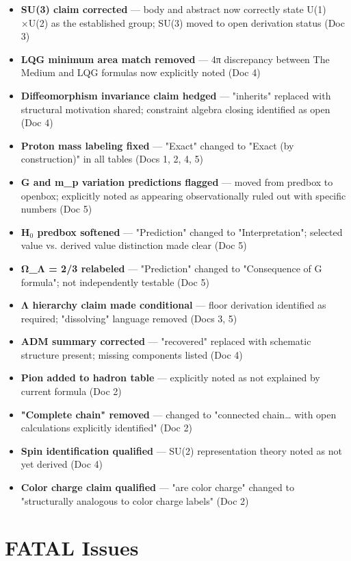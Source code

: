 \documentclass[11pt,letterpaper]{article}
\begin{document}
\begin{itemize}
\item \textbf{SU(3) claim corrected} --- body and abstract now correctly state U(1) ×U(2)
as the established group; SU(3) moved to open derivation status (Doc 3)
\item \textbf{LQG minimum area match removed} --- 4π discrepancy between The Medium and
LQG formulas now explicitly noted (Doc 4)
\item \textbf{Diffeomorphism invariance claim hedged} --- "inherits" replaced with
structural motivation shared; constraint algebra closing identified as open (Doc 4)
\item \textbf{Proton mass labeling fixed} --- "Exact" changed to "Exact (by construction)"
in all tables (Docs 1, 2, 4, 5)
\item \textbf{G and m\_p variation predictions flagged} --- moved from predbox to openbox;
explicitly noted as appearing observationally ruled out with specific numbers (Doc 5)
\item \textbf{H\(_0\) predbox softened} --- "Prediction" changed to "Interpretation"; selected
value vs. derived value distinction made clear (Doc 5)
\item \textbf{Ω\_Λ = 2/3 relabeled} --- "Prediction" changed to "Consequence of G formula";
not independently testable (Doc 5)
\item \textbf{Λ hierarchy claim made conditional} --- floor derivation identified as
required; "dissolving" language removed (Docs 3, 5)
\item \textbf{ADM summary corrected} --- "recovered" replaced with schematic structure
present; missing components listed (Doc 4)
\item \textbf{Pion added to hadron table} --- explicitly noted as not explained by current
formula (Doc 2)
\item \textbf{"Complete chain" removed} --- changed to "connected chain\ldots{} with open
calculations explicitly identified" (Doc 2)
\item \textbf{Spin identification qualified} --- SU(2) representation theory noted as not
yet derived (Doc 4)
\item \textbf{Color charge claim qualified} --- "are color charge" changed to "structurally
analogous to color charge labels" (Doc 2)
\end{itemize}

\section{{\bfseries\sffamily FATAL} Issues}
\label{sec:org5f0cef4}
\end{document}
